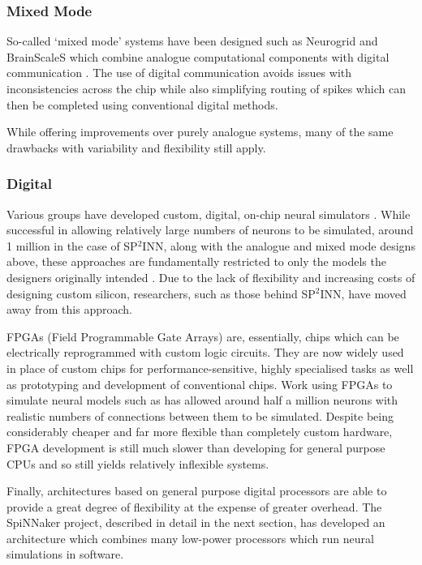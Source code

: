 			\subsubsection{Mixed Mode}
				
				So-called `mixed mode' systems have been designed such as Neurogrid and
				BrainScaleS which combine analogue computational components with digital
				communication \cite{choudhary12,maguire07}. The use of digital
				communication avoids issues with inconsistencies across the chip while
				also simplifying routing of spikes which can then be completed using
				conventional digital methods.
				
				While offering improvements over purely analogue systems, many of the same
				drawbacks with variability and flexibility still apply.
			
			\subsubsection{Digital}
				
				Various groups have developed custom, digital, on-chip neural simulators
				\cite{prange93,jahnke96,schoenauer99,mehrtash03}. While successful in
				allowing relatively large numbers of neurons to be simulated, around 1
				million in the case of SP$^2$INN, along with the analogue and mixed mode
				designs above, these approaches are fundamentally restricted to only the
				models the designers originally intended \cite{mehrtash03}. Due to the
				lack of flexibility and increasing costs of designing custom silicon,
				researchers, such as those behind SP$^2$INN, have moved away from this
				approach.
				
				FPGAs (Field Programmable Gate Arrays) are, essentially, chips which can
				be electrically reprogrammed with custom logic circuits. They are now
				widely used in place of custom chips for performance-sensitive, highly
				specialised tasks as well as prototyping and development of conventional
				chips. Work using FPGAs to simulate neural models such as
				\cite{hellmich05} has allowed around half a million neurons with realistic
				numbers of connections between them to be simulated. Despite being
				considerably cheaper and far more flexible than completely custom
				hardware, FPGA development is still much slower than developing for
				general purpose CPUs and so still yields relatively inflexible systems.
				
				Finally, architectures based on general purpose digital processors are
				able to provide a great degree of flexibility at the expense of greater
				overhead\cite{furber07}. The SpiNNaker project, described in detail in the
				next section, has developed an architecture which combines many low-power
				processors which run neural simulations in software.
		
